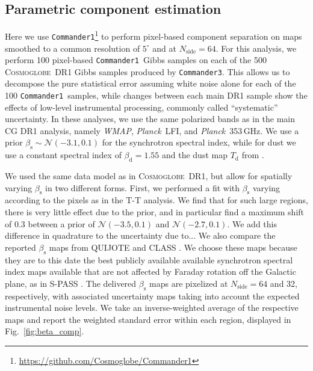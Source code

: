 \documentclass[twocolumn]{../../common/aa}
\def\WMAP{\emph{WMAP}}
\def\Planck{\emph{Planck}}
\def\commanderone{\texttt{Commander1}}
\def\commanderthree{\texttt{Commander3}}
\newcommand{\cosmoglobe}{\textsc{Cosmoglobe}}
\begin{document}


\subsection{Parametric component estimation}
\label{sec:comm1}

Here we use \commanderone\footnote{\url{https://github.com/Cosmoglobe/Commander1}} to perform pixel-based component separation on maps smoothed to a common resolution of $5^\circ$ and at $N_\mathrm{side}=64$. 
For this analysis, we perform 100 pixel-based \commanderone\ Gibbs samples on each of the 500 \cosmoglobe\ DR1 Gibbs samples produced by \commanderthree. This allows us to decompose the pure statistical error assuming white noise alone for each of the 100 \commanderone\ samples, while changes between each main DR1 sample show the effects of low-level instrumental processing, commonly called ``systematic'' uncertainty. In these analyses, we use the same polarized bands as in the main CG DR1 analysis, namely \WMAP, \Planck\ LFI, and \Planck\ 353\,GHz. We use a prior $\beta_\mathrm s\sim\mathcal N(-3.1, 0.1)$ for the synchrotron spectral index, while for dust we use a constant spectral index of $\beta_\mathrm d=1.55$ and the dust map $T_\mathrm d$ from \citet{planck2014-a12}.

We used the same data model as in \cosmoglobe\ DR1, but allow for spatially varying $\beta_\mathrm s$ in two different forms.
First, we performed a fit with $\beta_\mathrm s$ varying according to the pixels as in the T-T analysis.
We find that for such large regions, there is very little effect due to the prior, and in particular find a maximum shift of 0.3 between a prior of $\mathcal N(-3.5,0.1)$ and $\mathcal N(-2.7, 0.1)$. We add this difference in quadrature to the uncertainty due to... 
We also compare the reported $\beta_\mathrm s$ maps from QUIJOTE \citep{QUIJOTE_VIII} and CLASS \citep{eimer2023}. We choose these maps because they are to this date the best publicly available available synchrotron spectral index maps available that are not affected by Faraday rotation off the Galactic plane, as in S-PASS \citep{krachmalnicoff2018,fuskeland:2019}. The delivered $\beta_\mathrm s$ maps are pixelized at $N_\mathrm{side}=64$ and 32, respectively, with associated uncertainty maps taking into account the expected instrumental noise levels. We take an inverse-weighted average of the respective maps and report the weighted standard error within each region, displayed in Fig.~\ref{fig:beta_comp}. 
\end{document}
